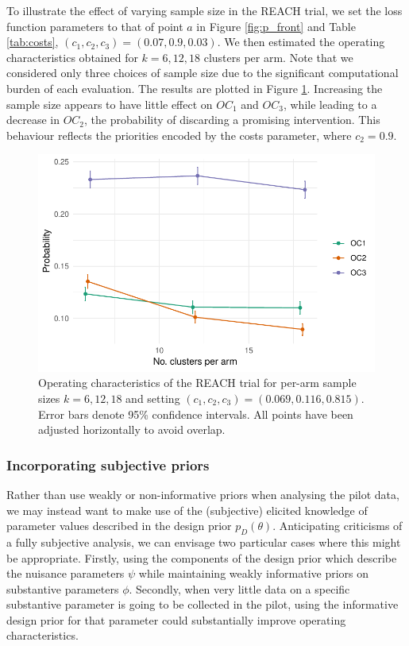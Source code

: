 \documentclass[AMA,STIX1COL]{WileyNJD-v2}
\begin{document}
To illustrate the effect of varying sample size in the REACH trial, we set the loss function parameters to that of point $a$ in Figure \ref{fig:p_front} and Table \ref{tab:costs}, $(c_1, c_2, c_3) = (0.07, 0.9, 0.03)$. We then estimated the operating characteristics obtained for $k = 6, 12, 18$ clusters per arm. Note that we considered only three choices of sample size due to the significant computational burden of each evaluation. The results are plotted in Figure \ref{fig:k_comp}. Increasing the sample size appears to have little effect on $OC_1$ and $OC_3$, while leading to a decrease in $OC_2$, the probability of discarding a promising intervention. This behaviour reflects the priorities encoded by the costs parameter, where $c_2 = 0.9$.

\begin{figure}
\centering
\includegraphics[scale=0.8]{./figures/k_comp}
\caption{Operating characteristics of the REACH trial for per-arm sample sizes $k = 6, 12, 18$ and setting $(c_1, c_2, c_3) = (0.069, 0.116, 0.815)$. Error bars denote 95\% confidence intervals. All points have been adjusted horizontally to avoid overlap.}
\label{fig:k_comp}
\end{figure}

\subsubsection{Incorporating subjective priors}

Rather than use weakly or non-informative priors when analysing the pilot data, we may instead want to make use of the (subjective) elicited knowledge of parameter values described in the design prior $p_D(\theta)$. Anticipating criticisms of a fully subjective analysis, we can envisage two particular cases where this might be appropriate. Firstly, using the components of the design prior which describe the nuisance parameters $\psi$ while maintaining weakly informative priors on substantive parameters $\phi$. Secondly, when very little data on a specific substantive parameter is going to be collected in the pilot, using the informative design prior for that parameter could substantially improve operating characteristics.
\end{document}
